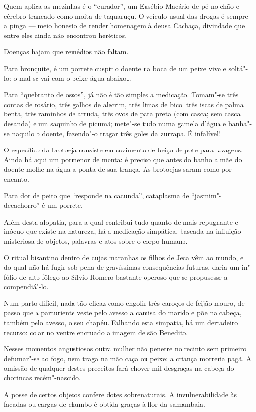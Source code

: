 Quem aplica as mezinhas é o ``curador'', um Eusébio Macário de pé no
chão e cérebro trancado como moita de taquaruçu. O veículo usual das
drogas é sempre a pinga --- meio honesto de render homenagem à deusa
Cachaça, divindade que entre eles ainda não encontrou heréticos.

Doenças hajam que remédios não faltam.

Para bronquite, é um porrete cuspir o doente na boca de um peixe vivo e
soltá"-lo: o mal se vai com o peixe água abaixo\ldots{}

Para ``quebranto de ossos'', já não é tão simples a medicação. Tomam"-se
três contas de rosário, três galhos de alecrim, três limas de bico, três
iscas de palma benta, três raminhos de arruda, três ovos de pata preta
(com casca; sem casca desanda) e um saquinho de picumã; mete"-se tudo
numa gamela d'água e banha"-se naquilo o doente, fazendo"-o tragar três
goles da zurrapa. É infalível!

O específico da brotoeja consiste em cozimento de beiço de pote para
lavagens. Ainda há aqui um pormenor de monta: é preciso que antes do
banho a mãe do doente molhe na água a ponta de sua trança. As brotoejas
saram como por encanto.

Para dor de peito que ``responde na cacunda'', cataplasma de
``jasmim"-decachorro'' é um porrete.

Além desta alopatia, para a qual contribui tudo quanto de mais
repugnante e inócuo que existe na natureza, há a medicação simpática,
baseada na influição misteriosa de objetos, palavras e atos sobre o
corpo humano.

O ritual bizantino dentro de cujas maranhas os filhos de Jeca vêm ao
mundo, e do qual não há fugir sob pena de gravíssimas consequências
futuras, daria um in"-fólio de alto fôlego ao Sílvio Romero bastante
operoso que se propusesse a compendiá"-lo.

Num parto difícil, nada tão eficaz como engolir três caroços de feijão
mouro, de passo que a parturiente veste pelo avesso a camisa do marido e
põe na cabeça, também pelo avesso, o seu chapéu. Falhando esta simpatia,
há um derradeiro recurso: colar no ventre encruado a imagem de são
Benedito.

Nesses momentos angustiosos outra mulher não penetre no recinto sem
primeiro defumar"-se ao fogo, nem traga na mão caça ou peixe: a criança
morreria pagã. A omissão de qualquer destes preceitos fará chover mil
desgraças na cabeça do chorincas recém"-nascido.

A posse de certos objetos confere dotes sobrenaturais. A
invulnerabilidade às facadas ou cargas de chumbo é obtida graças à flor
da samambaia.

